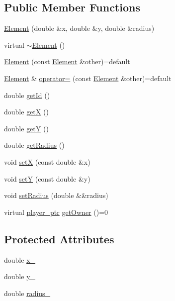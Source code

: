 \subsection*{Public Member Functions}
\begin{DoxyCompactItemize}
\item 
\hyperlink{classwebsocket_1_1Element_a6d6b671ae2f922c12c0a64a94bd669fb}{Element} (double \&x, double \&y, double \&radius)
\item 
virtual \hyperlink{classwebsocket_1_1Element_a6d08a32162fcbc445a491259598f465f}{$\sim$\+Element} ()
\item 
\hyperlink{classwebsocket_1_1Element_a7b16c1d2898cb3d1db6b5305045838bf}{Element} (const \hyperlink{classwebsocket_1_1Element}{Element} \&other)=default
\item 
\hyperlink{classwebsocket_1_1Element}{Element} \& \hyperlink{classwebsocket_1_1Element_a3c188d2039c89735c2d5e09123266397}{operator=} (const \hyperlink{classwebsocket_1_1Element}{Element} \&other)=default
\item 
double \hyperlink{classwebsocket_1_1Element_adb9892f7b44913049e0c771816efd7a4}{get\+Id} ()
\item 
double \hyperlink{classwebsocket_1_1Element_a6102d0b4ccbad0194ee393fa5341cabc}{getX} ()
\item 
double \hyperlink{classwebsocket_1_1Element_a597f360c2c593a6610a2a9103d5e876b}{getY} ()
\item 
double \hyperlink{classwebsocket_1_1Element_a895b218f0ec4d2d4e2164c2531a8ffe3}{get\+Radius} ()
\item 
void \hyperlink{classwebsocket_1_1Element_aba38ddf15ce77e2e79bce80cf38947db}{setX} (const double \&x)
\item 
void \hyperlink{classwebsocket_1_1Element_ab05d0ca40f4d1a79d52cb31c5b4f789b}{setY} (const double \&y)
\item 
void \hyperlink{classwebsocket_1_1Element_a4ad55c97fa8f5684af5bc25780450db1}{set\+Radius} (double \&\&radius)
\item 
virtual \hyperlink{namespacewebsocket_aec8d52893bdf524a1412533a63b006a3}{player\+\_\+ptr} \hyperlink{classwebsocket_1_1Element_a28027c861e94306a7666d839db910f2a}{get\+Owner} ()=0
\end{DoxyCompactItemize}
\subsection*{Protected Attributes}
\begin{DoxyCompactItemize}
\item 
double \hyperlink{classwebsocket_1_1Element_adb51cfefd07378c784d30340c449a224}{x\+\_\+}
\item 
double \hyperlink{classwebsocket_1_1Element_a61ea05afb0180339005d1c96786a60ce}{y\+\_\+}
\item 
double \hyperlink{classwebsocket_1_1Element_aec20349985f8c1bc19d6f686658e6c62}{radius\+\_\+}
\end{DoxyCompactItemize}

